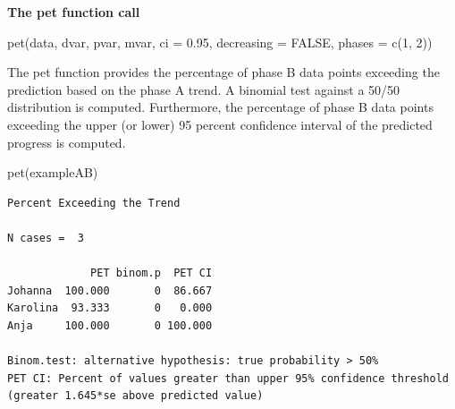 \documentclass[
  letterpaper,
  DIV=11,
  numbers=noendperiod]{scrreprt}
\newenvironment{Shaded}{\begin{snugshade}}{\end{snugshade}}
\newcommand{\FunctionTok}[1]{\textcolor[rgb]{0.28,0.35,0.67}{#1}}
\newcommand{\NormalTok}[1]{\textcolor[rgb]{0.00,0.23,0.31}{#1}}
\begin{document}
\begin{tcolorbox}[enhanced jigsaw, breakable, rightrule=.15mm, bottomrule=.15mm, arc=.35mm, colback=white, colframe=quarto-callout-tip-color-frame, opacityback=0, leftrule=.75mm, toprule=.15mm, left=2mm]
\begin{minipage}[t]{5.5mm}
\textcolor{quarto-callout-tip-color}{\faLightbulb}
\end{minipage}%
\begin{minipage}[t]{\textwidth - 5.5mm}

\textbf{The pet function call}\vspace{2mm}

pet(data, dvar, pvar, mvar, ci = 0.95, decreasing = FALSE, phases = c(1,
2))

\end{minipage}%
\end{tcolorbox}

The pet function provides the percentage of phase B data points
exceeding the prediction based on the phase A trend. A binomial test
against a 50/50 distribution is computed. Furthermore, the percentage of
phase B data points exceeding the upper (or lower) 95 percent confidence
interval of the predicted progress is computed.

\begin{Shaded}
\begin{Highlighting}[]
\FunctionTok{pet}\NormalTok{(exampleAB)}
\end{Highlighting}
\end{Shaded}

\begin{verbatim}
Percent Exceeding the Trend

N cases =  3 

             PET binom.p  PET CI
Johanna  100.000       0  86.667
Karolina  93.333       0   0.000
Anja     100.000       0 100.000

Binom.test: alternative hypothesis: true probability > 50%
PET CI: Percent of values greater than upper 95% confidence threshold (greater 1.645*se above predicted value)
\end{verbatim}
\end{document}
